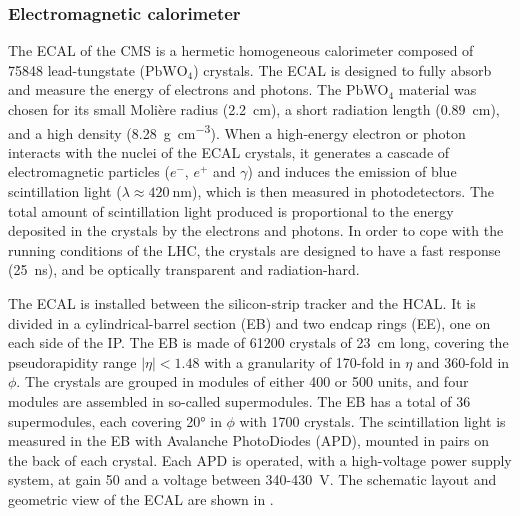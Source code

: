 \subsubsection{Electromagnetic calorimeter}\label{sec:Experiment_CMS_Subdetectors_ECAL}

The ECAL of the CMS is a hermetic homogeneous calorimeter composed of 75848 lead-tungstate ($\text{PbWO}_{4}$) crystals. The ECAL is designed to fully absorb and measure the energy of electrons and photons. The $\text{PbWO}_{4}$ material was chosen for its small Moli{\`e}re radius (\SI{2.2}{\cm}), a short radiation length (\SI{0.89}{\cm}), and a high density (\SI{8.28}{\gram\per\cm\cubed}). When a high-energy electron or photon interacts with the nuclei of the ECAL crystals, it generates a cascade of electromagnetic particles ($e^{-}$, $e^{+}$ and $\gamma$) and induces the emission of blue scintillation light ($\lambda\approx\SI{420}{\nm}$), which is then measured in photodetectors. The total amount of scintillation light produced is proportional to the energy deposited in the crystals by the electrons and photons. In order to cope with the running conditions of the LHC, the crystals are designed to have a fast response (\SI{25}{\ns}), and be optically transparent and radiation-hard.

The ECAL is installed between the silicon-strip tracker and the HCAL. It is divided in a cylindrical-barrel section (EB) and two endcap rings (EE), one on each side of the IP. The EB is made of 61200 crystals of \SI{23}{\cm} long, covering the pseudorapidity range $|\eta|<1.48$ with a granularity of 170-fold in $\eta$ and 360-fold in $\phi$. The crystals are grouped in modules of either 400 or 500 units, and four modules are assembled in so-called supermodules. The EB has a total of 36 supermodules, each covering \ang{20} in $\phi$ with 1700 crystals. The scintillation light is measured in the EB with Avalanche PhotoDiodes (APD), mounted in pairs on the back of each crystal. Each APD is operated, with a high-voltage power supply system, at gain 50 and a voltage between 340-\SI{430}{\V}. The schematic layout and geometric view of the ECAL are shown in .

